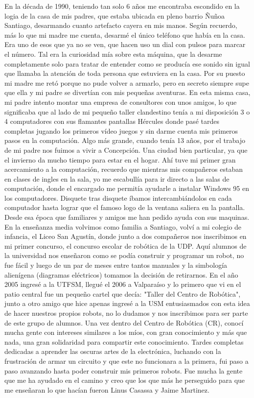 En la década de 1990, teniendo tan solo 6 años me encontraba escondido en la logia de la casa de mis padres, que estaba ubicada en pleno barrio Ñuñoa Santiago, desarmando cuanto artefacto cayera en mis manos. Según recuerdo, más lo que mi madre me cuenta, desarmé el único teléfono que había en la casa. Era uno de esos que ya no se ven, que hacen uso un dial con pulsos para marcar el número. Tal era la curiosidad mía sobre esta máquina, que la desarme completamente solo para tratar de entender como se producía ese sonido sin igual que llamaba la atención de toda persona que estuviera en la casa. Por su puesto mi madre me retó porque no pude volver a armarlo, pero en secreto siempre supe que ella y mi padre se divertían con mis pequeñas aventuras. En esta misma casa, mi padre intento montar una empresa de consultores con unos amigos, lo que significaba que al lado de mi pequeño taller clandestino tenía a mi disposición 3 o 4 computadores con sus flamantes pantallas Hércules donde pasé tardes completas jugando los primeros vídeo juegos y sin darme cuenta mis primeros pasos en la computación. Algo más grande, cuando tenía 13 años, por el trabajo de mi padre nos fuimos a vivir a Concepción. Una ciudad bien particular, ya que el invierno da mucho tiempo para estar en el hogar. Ahí tuve mi primer gran acercamiento a la computación, recuerdo que mientras mis compañeros estaban en clases de ingles en la sala, yo me escabullía para ir directo a las salas de computación, donde el encargado me permitía ayudarle a instalar Windows 95 en los computadores. Disquete tras disquete íbamos intercambiándolos en cada computador hasta lograr que el famoso logo de la ventana saliera en la pantalla. Desde esa época que familiares y amigos me han pedido ayuda con sus maquinas. En la enseñanza media volvimos como familia a Santiago, volví a mi colegio de infancia, el Liceo San Agustín, donde junto a dos compañeros nos inscribimos en mi primer concurso, el concurso escolar de robótica de la UDP. Aquí alumnos de la universidad nos enseñaron como se podía construir y programar un robot, no fue fácil y luego de un par de meses entre tantos manuales y la simbología alienígena (diagramas eléctricos) tomamos la decisión de retirarnos. En el año 2005 ingresé a la UTFSM, llegué el 2006 a Valparaíso y lo primero que vi en el patio central fue un pequeño cartel que decía: "Taller del Centro de Robótica", junto a otro amigo que hice apenas ingresé a la USM entusiasmados con esta idea de hacer nuestros propios robots, no lo dudamos y nos inscribimos para ser parte de este grupo de alumnos. Una vez dentro del Centro de Robótica (CR), conocí mucha gente con intereses similares a los míos, con gran conocimiento y más que nada, una gran solidaridad para compartir este conocimiento. Tardes completas dedicadas a aprender las oscuras artes de la electrónica, luchando con la frustración de armar un circuito y que este no funcionara a la primera, fui paso a paso avanzando hasta poder construir mis primeros robots. Fue mucha la gente que me ha ayudado en el camino y creo que los que más he perseguido para que me enseñaran lo que hacían fueron Linus Casassa y Jaime Martinez. 


